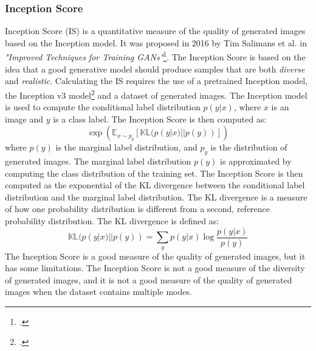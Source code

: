 \subsubsection{Inception Score}
\label{subsubsec:inception-score}
Inception Score (IS) is a quantitative measure of the quality of generated images based on the Inception model.
It was proposed in 2016 by Tim Salimans et al. in \emph{"Improved Techniques for Training GANs"}\footcite{paper:salimans2016improved}.
The Inception Score is based on the idea that a good generative model should produce samples that are both \emph{diverse} and \emph{realistic}.
Calculating the IS requires the use of a pretrained Inception model, the Inception v3 model\footcite{paper:inceptionv3} and a dataset of generated images.
The Inception model is used to compute the conditional label distribution $p(y|x)$, where $x$ is an image and $y$ is a class label.
The Inception Score is then computed as:
\begin{equation}
    \label{eq:inception-score}
    \exp \left( \mathbb{E}_{x \sim p_{g}} \left[ \mathbb{KL}(p(y|x) || p(y)) \right] \right)
\end{equation}
where $p(y)$ is the marginal label distribution, and $p_{g}$ is the distribution of generated images.
The marginal label distribution $p(y)$ is approximated by computing the class distribution of the training set.
The Inception Score is then computed as the exponential of the KL divergence between the conditional label distribution and the marginal label distribution.
The KL divergence is a measure of how one probability distribution is different from a second, reference probability distribution.
The KL divergence is defined as:
\begin{equation}
    \label{eq:kl-divergence}
    \mathbb{KL}(p(y|x) || p(y)) = \sum_{y} p(y|x) \log \frac{p(y|x)}{p(y)}
\end{equation}
The Inception Score is a good measure of the quality of generated images, but it has some limitations.
The Inception Score is not a good measure of the diversity of generated images, and it is not a good measure of the quality of generated images when the dataset contains multiple modes.
